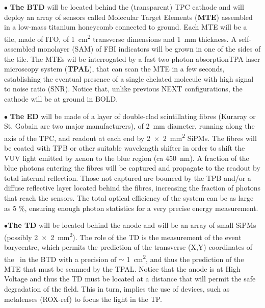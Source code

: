 \documentclass[a4paper,11pt]{article}
\begin{document}
$\bullet$ \textbf{The BTD} will be located behind the (transparent) TPC cathode and will deploy an array of sensors called Molecular Target Elements (\textbf{MTE}) assembled in a low-mass titanium honeycomb connected to ground. Each MTE will be a tile, made of ITO, of \SI{1}{cm^2} transverse dimensions and \SI{1}{mm} thickness. A self-assembled monolayer (SAM) of FBI indicators will be grown in one of the sides of the tile. The MTEs wil be interrogated by a fast two-photon absorptionTPA laser microscopy system (\textbf{TPAL}), that can scan the MTE in a few seconds, establishing the eventual presence of a single chelated molecule with high signal to noise ratio (SNR). Notice that, unlike previous NEXT configurations, the cathode will be at ground in BOLD. 

$\bullet$ \textbf{The ED} will be made of a layer of double-clad scintillating fibres (Kuraray or St. Gobain are two major manufacturers), of \SI{2}{mm} diameter, running along the axis of the TPC, and readout at each end by \SI{2x2}{mm^2} SiPMs. The fibres will be coated with TPB or other suitable wavelength shifter in order to shift the VUV light emitted by xenon to the blue region (ca \SI{450}{nm}). A fraction of the blue photons entering the fibres will be captured and propagate to the readout by total internal reflection. Those not captured are bounced by the TPB and/or a diffuse reflective layer located behind the fibres, increasing the fraction of photons that reach the sensors. The total optical efficiency of the system can be as large as 5 \%, ensuring enough photon statistics for a very precise energy measurement. 

$\bullet$\textbf{The TD} will be located behind the anode and will be an  array of small SiPMs (possibly \SI{2x2}{mm^2}). The role of the TD is the measurement of the event barycentre, which permits the prediction of the transverse (X,Y) coordinates of the \Bapp\ in the BTD with a precision of $\sim$ \SI{1}{cm^2}, and thus the prediction of the MTE that must be scanned by the TPAL. Notice that the anode is at High Voltage and thus the TD must be located at a distance that will permit the safe degradation of the field. This in turn, implies the use of devices, such as metalenses (ROX-ref) to focus the light in the TP. 
\end{document}

